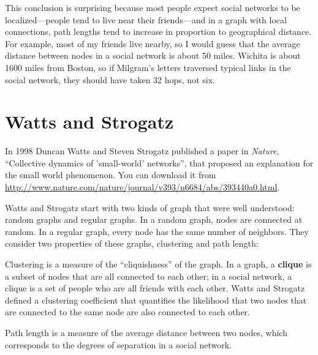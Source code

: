 \documentclass[12pt]{book}
\theoremstyle{exercise}
\begin{document}
This conclusion is surprising because most people expect social
networks to be localized---people tend to live near their
friends---and in a graph with local connections, path lengths tend to
increase in proportion to geographical distance.  For example, most of
my friends live nearby, so I would guess that the average distance
between nodes in a social network is about 50 miles.  Wichita is about
1600 miles from Boston, so if Milgram's letters traversed typical
links in the social network, they should have taken 32 hops, not six.


\section{Watts and Strogatz}

In 1998 Duncan Watts and Steven Strogatz published a paper in {\em
  Nature}, ``Collective dynamics of 'small-world' networks'', that
proposed an explanation for the small world phenomenon.  You can
download it from
\url{http://www.nature.com/nature/journal/v393/n6684/abs/393440a0.html}.
  

Watts and Strogatz start with two kinds of graph that were well
understood: random graphs and regular graphs.  In a random graph, nodes
are connected at random.  In a regular graph, every node has the
same number of neighbors.
They consider two
properties of these graphs, clustering and path length:

\begin{description}

\item Clustering is a measure of the ``cliquishness'' of the graph.
In a graph, a {\bf clique} is a subset of nodes that are
all connected to each other; in a social network, a clique is
a set of people who are all friends with each other.  Watts and Strogatz
defined a clustering coefficient that quantifies the likelihood
that two nodes that are connected to the same node are also
connected to each other.

\item Path length is a measure of the average distance between
two nodes, which corresponds to the degrees of separation in
a social network.

\end{description}
\end{document}
